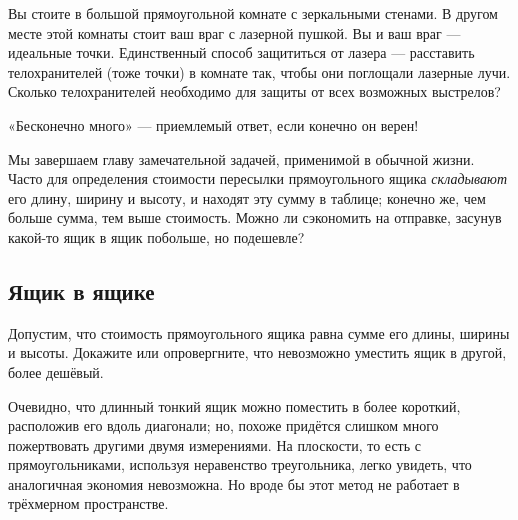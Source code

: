 Вы стоите в большой прямоугольной комнате с зеркальными стенами.
В другом месте этой комнаты стоит ваш враг с лазерной пушкой.
Вы и ваш враг --- идеальные точки.
Единственный способ защититься от лазера --- расставить телохранителей (тоже точки) в комнате так, чтобы они поглощали лазерные лучи.
Сколько телохранителей необходимо для защиты от всех возможных выстрелов?

 «Бесконечно много» --- приемлемый ответ, если конечно он верен!

\medskip

Мы завершаем главу замечательной задачей, применимой в обычной жизни.
Часто для определения стоимости пересылки прямоугольного ящика \emph{складывают} его длину, ширину и высоту,
и находят эту сумму в таблице;
конечно же, чем больше сумма, тем выше стоимость.
Можно ли сэкономить на отправке, засунув какой-то ящик в ящик побольше, но подешевле?

\subsection*{Ящик в ящике}\label{Ящик в ящике}


Допустим, что стоимость прямоугольного ящика равна сумме его длины, ширины и высоты.
Докажите или опровергните, что невозможно уместить ящик в другой, более дешёвый.

Очевидно, что длинный тонкий ящик можно поместить в более короткий, расположив его вдоль диагонали;
но, похоже придётся слишком много пожертвовать другими двумя измерениями.
На плоскости, то есть с прямоугольниками, используя неравенство треугольника, легко увидеть, что аналогичная экономия невозможна.
Но вроде бы этот метод не работает в трёхмерном пространстве.
